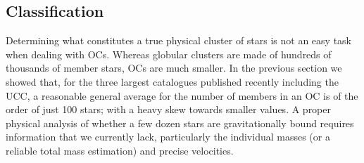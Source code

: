 \documentclass[fleqn,usenatbib]{mnras}
\begin{document}




\subsection{Classification}
\label{ssec:classif}

Determining what constitutes a true physical cluster of stars is not an easy
task when dealing with OCs. Whereas globular clusters are made of hundreds of
thousands of member stars, OCs are much smaller. In the previous section we
showed that, for the three largest catalogues published recently including
the UCC, a reasonable general average for the number of members in an
OC is of the order of just 100 stars; with a heavy skew towards smaller values.
A proper physical analysis of whether a few dozen stars are gravitationally
bound requires information that we currently lack, particularly the individual
masses (or a reliable total mass estimation) and precise velocities.
\end{document}
